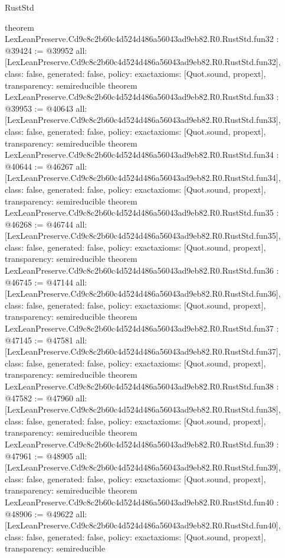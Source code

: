 \begin{lexlean}{RustStd}
\begin{coremodule}
{}
theorem LexLeanPreserve.Cd9c8c2b60c4d524d486a56043ad9eb82.R0.RustStd.fun32 : @39424 := @39952 {
  all: [LexLeanPreserve.Cd9c8c2b60c4d524d486a56043ad9eb82.R0.RustStd.fun32],
  class: false,
  generated: false,
  policy: exact{axioms: [Quot.sound, propext]},
  transparency: semireducible
}
theorem LexLeanPreserve.Cd9c8c2b60c4d524d486a56043ad9eb82.R0.RustStd.fun33 : @39953 := @40643 {
  all: [LexLeanPreserve.Cd9c8c2b60c4d524d486a56043ad9eb82.R0.RustStd.fun33],
  class: false,
  generated: false,
  policy: exact{axioms: [Quot.sound, propext]},
  transparency: semireducible
}
theorem LexLeanPreserve.Cd9c8c2b60c4d524d486a56043ad9eb82.R0.RustStd.fun34 : @40644 := @46267 {
  all: [LexLeanPreserve.Cd9c8c2b60c4d524d486a56043ad9eb82.R0.RustStd.fun34],
  class: false,
  generated: false,
  policy: exact{axioms: [Quot.sound, propext]},
  transparency: semireducible
}
theorem LexLeanPreserve.Cd9c8c2b60c4d524d486a56043ad9eb82.R0.RustStd.fun35 : @46268 := @46744 {
  all: [LexLeanPreserve.Cd9c8c2b60c4d524d486a56043ad9eb82.R0.RustStd.fun35],
  class: false,
  generated: false,
  policy: exact{axioms: [Quot.sound, propext]},
  transparency: semireducible
}
theorem LexLeanPreserve.Cd9c8c2b60c4d524d486a56043ad9eb82.R0.RustStd.fun36 : @46745 := @47144 {
  all: [LexLeanPreserve.Cd9c8c2b60c4d524d486a56043ad9eb82.R0.RustStd.fun36],
  class: false,
  generated: false,
  policy: exact{axioms: [Quot.sound, propext]},
  transparency: semireducible
}
theorem LexLeanPreserve.Cd9c8c2b60c4d524d486a56043ad9eb82.R0.RustStd.fun37 : @47145 := @47581 {
  all: [LexLeanPreserve.Cd9c8c2b60c4d524d486a56043ad9eb82.R0.RustStd.fun37],
  class: false,
  generated: false,
  policy: exact{axioms: [Quot.sound, propext]},
  transparency: semireducible
}
theorem LexLeanPreserve.Cd9c8c2b60c4d524d486a56043ad9eb82.R0.RustStd.fun38 : @47582 := @47960 {
  all: [LexLeanPreserve.Cd9c8c2b60c4d524d486a56043ad9eb82.R0.RustStd.fun38],
  class: false,
  generated: false,
  policy: exact{axioms: [Quot.sound, propext]},
  transparency: semireducible
}
theorem LexLeanPreserve.Cd9c8c2b60c4d524d486a56043ad9eb82.R0.RustStd.fun39 : @47961 := @48905 {
  all: [LexLeanPreserve.Cd9c8c2b60c4d524d486a56043ad9eb82.R0.RustStd.fun39],
  class: false,
  generated: false,
  policy: exact{axioms: [Quot.sound, propext]},
  transparency: semireducible
}
theorem LexLeanPreserve.Cd9c8c2b60c4d524d486a56043ad9eb82.R0.RustStd.fun40 : @48906 := @49622 {
  all: [LexLeanPreserve.Cd9c8c2b60c4d524d486a56043ad9eb82.R0.RustStd.fun40],
  class: false,
  generated: false,
  policy: exact{axioms: [Quot.sound, propext]},
  transparency: semireducible
}
\end{coremodule}
\end{lexlean}
